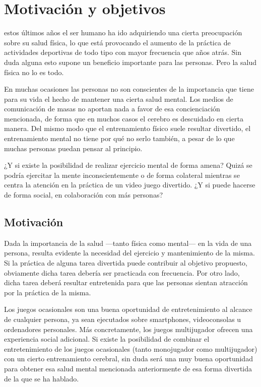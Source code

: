 \chapter{Motivación y objetivos}
\label{chap:objetivos}

 estos últimos años el ser humano ha ido adquiriendo una cierta preocupación sobre su salud física, lo que está provocando el aumento de la práctica de actividades deportivas de todo tipo con mayor frecuencia que años atrás. Sin duda alguna esto supone un beneficio importante para las personas. Pero la salud física no lo es todo.

En muchas ocasiones las personas no son conscientes de la importancia que tiene para su vida el hecho de mantener una cierta salud mental. Los medios de comunicación de masas no aportan nada a favor de esa concienciación mencionada, de forma que en muchos casos el cerebro es descuidado en cierta manera. Del mismo modo que el entrenamiento físico suele resultar divertido, el entrenamiento mental no tiene por qué no serlo también, a pesar de lo que muchas personas puedan pensar al principio.

¿Y si existe la posibilidad de realizar ejercicio mental de forma amena? Quizá se podría ejercitar la mente inconscientemente o de forma colateral mientras se centra la atención en la práctica de un video juego divertido. ¿Y si puede hacerse de forma social, en colaboración con más personas?

\section{Motivación}

Dada la importancia de la salud ---tanto física como mental--- en la vida de una persona, resulta evidente la necesidad del ejercicio y mantenimiento de la misma. Si la práctica de alguna tarea divertida puede contribuir al objetivo propuesto, obviamente dicha tarea debería ser practicada con frecuencia. Por otro lado, dicha tarea deberá resultar entretenida para que las personas sientan atracción por la práctica de la misma.

Los juegos ocasionales son una buena oportunidad de entretenimiento al alcance de cualquier persona, ya sean ejecutados sobre smartphones, videoconsolas u ordenadores personales. Más concretamente, los juegos multijugador ofrecen una experiencia social adicional. Si existe la posibilidad de combinar el entretenimiento de los juegos ocasionales (tanto monojugador como multijugador) con un cierto entrenamiento cerebral, sin duda será una muy buena oportunidad para obtener esa salud mental mencionada anteriormente de esa forma divertida de la que se ha hablado.

